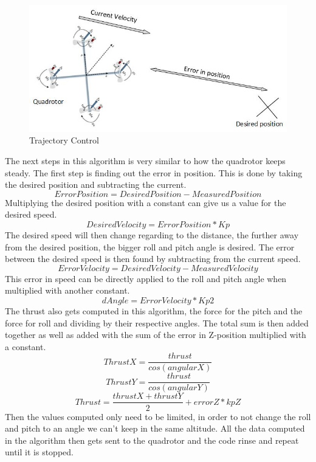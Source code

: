\begin{figure}[H]
          \centering
            \includegraphics[scale = 0.67]{VAPIQ-PICTURES/OBCS.jpg}
                \caption{Trajectory Control}
                \label{TrajectoryControl}
            \label{dir}
\end{figure} 
\noindent
The next steps in this algorithm is very similar to how the quadrotor keeps steady. The first step is finding out the error in position. This is done by taking the desired position and subtracting the current. 
\begin{equation}
   Error Position = Desired Position - Measured Position
\end{equation}
\noindent
Multiplying the desired position with a constant can give us a value for the desired speed. 
\begin{equation}
   Desired Velocity = Error Position * Kp
\end{equation}
\noindent
The desired speed will then change regarding to the distance, the further away from the desired position, the bigger roll and pitch angle is desired. The error between the desired speed is then found by subtracting from the current speed.
\begin{equation}
    Error Velocity = Desired Velocity - Measured Velocity
\end{equation}
\noindent
This error in speed can be directly applied to the roll and pitch angle when multiplied with another constant. 
\begin{equation}
   dAngle =  Error Velocity * Kp2
\end{equation}
\noindent
The thrust also gets computed in this algorithm, the force for the pitch and the force for roll and dividing by their respective angles. The total sum is then added together as well as added with the sum of the error in Z-position multiplied with a constant. 
\begin{equation}
        ThrustX = \frac{thrust}{cos(angularX)}
\end{equation}
\noindent
\begin{equation}
        ThrustY = \frac{thrust}{cos(angularY)}
\end{equation}
\noindent
\begin{equation}
        Thrust = \frac{thrustX + thrustY}{2}  + errorZ*kpZ
\end{equation}
\noindent
Then the values computed only need to be limited, in order to not change the roll and pitch to an angle we can't keep in the same altitude. All the data computed in the algorithm then gets sent to the quadrotor and the code rinse and repeat until it is stopped.

